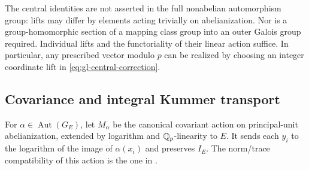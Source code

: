The central identities are not asserted in the full nonabelian
automorphism group: lifts may differ by elements acting trivially
on abelianization. Nor is a group-homomorphic section of a mapping
class group into an outer Galois group required. Individual lifts
and the functoriality of their linear action suffice. In particular,
any prescribed vector modulo $p$ can be realized by choosing an
integer coordinate lift in \eqref{eq:gl-central-correction}.

\subsection{Covariance and integral Kummer transport}

For $\alpha\in\operatorname{Aut}(G_E)$, let $M_\alpha$ be the
canonical covariant action on principal-unit abelianization, extended
by logarithm and $\mathbb Q_p$-linearity to $E$. It sends each $y_i$ to
the logarithm of the image of $\alpha(x_i)$ and preserves $I_E$.
The norm/trace compatibility of this action is the one in
\cite[Lemma~2.3]{HoshiNishio}.

